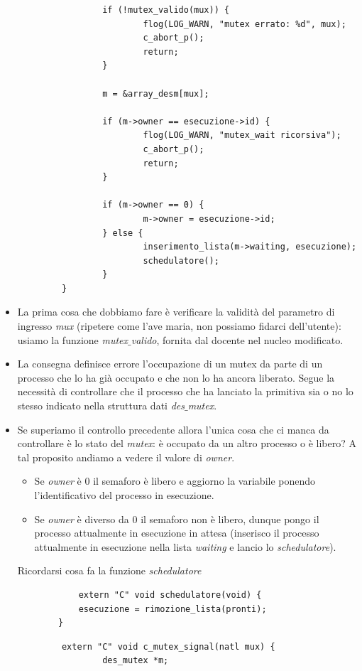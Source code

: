 \documentclass[11pt]{report}
\theoremstyle{definition}
\begin{document}
\begin{itemize}
\begin{verbatim}
				    if (!mutex_valido(mux)) {
					        flog(LOG_WARN, "mutex errato: %d", mux);
					        c_abort_p();
					        return;
				    }
				
				    m = &array_desm[mux];
				
				    if (m->owner == esecuzione->id) {
					        flog(LOG_WARN, "mutex_wait ricorsiva");
					        c_abort_p();
					        return;
				    }
				
				    if (m->owner == 0) {
					        m->owner = esecuzione->id;
				    } else {
					        inserimento_lista(m->waiting, esecuzione);
					        schedulatore();
				    }
			}
		\end{verbatim} 
		\begin{itemize}
			\item La prima cosa che dobbiamo fare è verificare la validità del parametro di ingresso \emph{mux} (ripetere come l'ave maria, non possiamo fidarci dell'utente): usiamo la funzione \emph{mutex$\_$valido}, fornita dal docente nel nucleo modificato.
			\item La consegna definisce errore l'occupazione di un mutex da parte di un processo che lo ha già occupato e che non lo ha ancora liberato. Segue la necessità di controllare che il processo che ha lanciato la primitiva sia o no lo stesso indicato nella struttura dati \emph{des$\_$mutex}. 
			\item Se superiamo il controllo precedente allora l'unica cosa che ci manca da controllare è lo stato del \emph{mutex}: è occupato da un altro processo o è libero? A tal proposito andiamo a vedere il valore di \emph{owner}.
			\begin{itemize}
				\item Se \emph{owner} è 0 il semaforo è libero e aggiorno la variabile ponendo l'identificativo del processo in esecuzione.
				\item Se \emph{owner} è diverso da 0 il semaforo non è libero, dunque pongo il processo attualmente in esecuzione in attesa (inserisco il processo attualmente in esecuzione nella lista \emph{waiting} e lancio lo \emph{schedulatore}).
			\end{itemize}
			Ricordarsi cosa fa la funzione \emph{schedulatore}
			\begin{verbatim}
			extern "C" void schedulatore(void) {
		    esecuzione = rimozione_lista(pronti);	
		}
			\end{verbatim}
		\end{itemize}
		\begin{verbatim}
			extern "C" void c_mutex_signal(natl mux) {
				    des_mutex *m;
				    

\end{verbatim}
\end{itemize}
\end{document}
